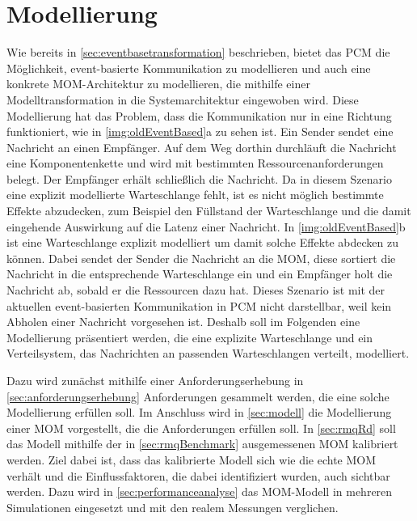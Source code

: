
\chapter{Modellierung}
\label{ch:modellierung}
Wie bereits in \autoref{sec:eventbasetransformation} beschrieben, bietet das PCM die Möglichkeit, event-basierte Kommunikation zu modellieren und auch eine konkrete MOM-Architektur zu modellieren, die mithilfe einer Modelltransformation in die Systemarchitektur eingewoben wird. Diese Modellierung hat das Problem, dass die Kommunikation nur in eine Richtung funktioniert, wie in \autoref{img:oldEventBased}a zu sehen ist. Ein Sender sendet eine Nachricht an einen Empfänger. Auf dem Weg dorthin durchläuft die Nachricht eine Komponentenkette und wird mit bestimmten Ressourcenanforderungen belegt. Der Empfänger erhält schließlich die Nachricht. Da in diesem Szenario eine explizit modellierte Warteschlange fehlt, ist es nicht möglich bestimmte Effekte abzudecken, zum Beispiel den Füllstand der Warteschlange und die damit eingehende Auswirkung auf die Latenz einer Nachricht. In \autoref{img:oldEventBased}b ist eine Warteschlange explizit modelliert um damit solche Effekte abdecken zu können. Dabei sendet der Sender die Nachricht an die MOM, diese sortiert die Nachricht in die entsprechende Warteschlange ein und ein Empfänger holt die Nachricht ab, sobald er die Ressourcen dazu hat. Dieses Szenario ist mit der aktuellen event-basierten Kommunikation in PCM nicht darstellbar, weil kein Abholen einer Nachricht vorgesehen ist. Deshalb soll im Folgenden eine Modellierung präsentiert werden, die eine explizite Warteschlange und ein Verteilsystem, das Nachrichten an passenden Warteschlangen verteilt, modelliert.\par
Dazu wird zunächst mithilfe einer Anforderungserhebung in \autoref{sec:anforderungserhebung} Anforderungen gesammelt werden, die eine solche Modellierung erfüllen soll. Im Anschluss wird in \autoref{sec:modell} die Modellierung einer MOM vorgestellt, die die Anforderungen erfüllen soll. In \autoref{sec:rmqRd} soll das Modell mithilfe der in \autoref{sec:rmqBenchmark} ausgemessenen MOM kalibriert werden. Ziel dabei ist, dass das kalibrierte Modell sich wie die echte MOM verhält und die Einflussfaktoren, die dabei identifiziert wurden, auch sichtbar werden. Dazu wird in \autoref{sec:performanceanalyse} das MOM-Modell in mehreren Simulationen eingesetzt und mit den realem Messungen verglichen. 
